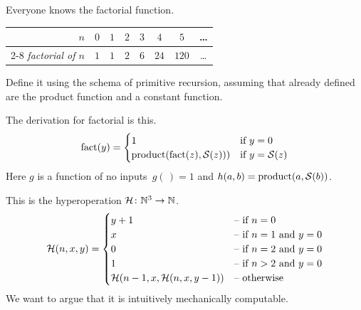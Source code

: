 \documentclass[noanswers, nolegalese, 11pt]{examjh}
\begin{document}
\begin{questions}
\question
Everyone knows the factorial function.
\begin{center}
\begin{tabular}{r|*{7}{c}}
  \textit{$n$}
    &$0$ &$1$ &$2$ &$3$ &$4$ &$5$ &\ldots{} \\ 
  \cline{2-8}
  \textit{factorial of $n$}
    &$1$ &$1$ &$2$ &$6$ &$24$ &$120$ &\ldots{}
\end{tabular}
\end{center}
Define it using the schema of primitive recursion,
assuming that already defined are the product function and a constant function.
\begin{solution}
The derivation for factorial is this.
\begin{equation*}
  \operatorname{fact}(y)=\begin{cases}
              1                  &\text{if $y=0$}  \\
              \operatorname{product}(\operatorname{fact}(z),\operatorname{\mathcal{S}}(z))) &\text{if $y=\operatorname{\mathcal{S}}(z)$}
            \end{cases}
\end{equation*}
Here $g$ is a function of no inputs~$g(\,)=1$ and 
$h(a,b)=\operatorname{product}(a,\operatorname{\mathcal{S}}(b))$.  
\end{solution}


\question
This is the hyperoperation 
$\mbox{$\mathcal{H}\colon \mathbb{N}^3\to \mathbb{N}$}$.
\begin{equation*}
  \mathcal{H}(n,x,y)=
  \begin{cases}
    y+1  &\text{-- if $n=0$}             \\
    x    &\text{-- if $n=1$ and $y=0$}   \\
    0    &\text{-- if $n=2$ and $y=0$}   \\
    1    &\text{-- if $n>2$ and $y=0$}   \\
    \mathcal{H}(n-1, x, \mathcal{H}(n, x, y-1)) &\text{-- otherwise}
  \end{cases}
\end{equation*}
We want to argue that it is intuitively mechanically computable.


\end{questions}
\end{document}
